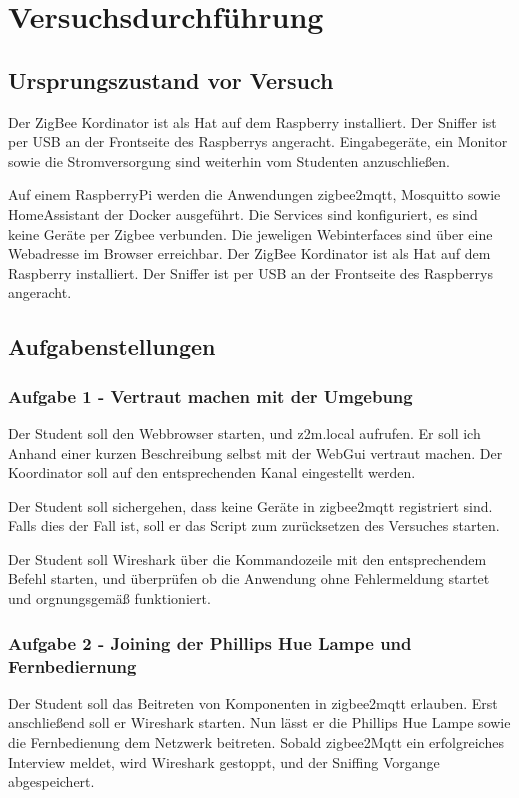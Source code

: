 \chapter{Versuchsdurchführung}

\section{Ursprungszustand vor Versuch}

Der ZigBee Kordinator ist als \grqq Hat \grqq{} auf dem Raspberry installiert. Der Sniffer ist per USB an der 
Frontseite des Raspberrys angeracht. Eingabegeräte, ein Monitor sowie die Stromversorgung sind weiterhin vom
Studenten anzuschließen.  

Auf einem RaspberryPi werden die Anwendungen zigbee2mqtt, Mosquitto sowie HomeAssistant der Docker ausgeführt. Die
Services sind konfiguriert, es sind keine Geräte per Zigbee verbunden. 
Die jeweligen Webinterfaces sind über eine Webadresse im Browser erreichbar. Der ZigBee Kordinator ist als \grqq Hat \grqq{}
auf dem Raspberry installiert. Der Sniffer ist per USB an der Frontseite des Raspberrys angeracht.  

\section{Aufgabenstellungen}

\subsection{Aufgabe 1 - Vertraut machen mit der Umgebung}

Der Student soll den Webbrowser starten, und z2m.local aufrufen. Er soll ich Anhand einer kurzen Beschreibung selbst
mit der WebGui vertraut machen. Der Koordinator soll auf den entsprechenden Kanal eingestellt werden.

Der Student soll sichergehen, dass keine Geräte in zigbee2mqtt registriert sind. Falls dies der Fall ist, soll
er das Script zum zurücksetzen des Versuches starten.

Der Student soll Wireshark über die Kommandozeile mit den entsprechendem Befehl starten, und überprüfen ob die Anwendung
ohne Fehlermeldung startet und orgnungsgemäß funktioniert.

\subsection{Aufgabe 2 - Joining der Phillips Hue Lampe und Fernbediernung}

Der Student soll das Beitreten von Komponenten in zigbee2mqtt erlauben. Erst anschließend soll er Wireshark starten.
Nun lässt er die Phillips Hue Lampe sowie die Fernbedienung dem Netzwerk beitreten. Sobald zigbee2Mqtt ein erfolgreiches
Interview meldet, wird Wireshark gestoppt, und der Sniffing Vorgange abgespeichert.




